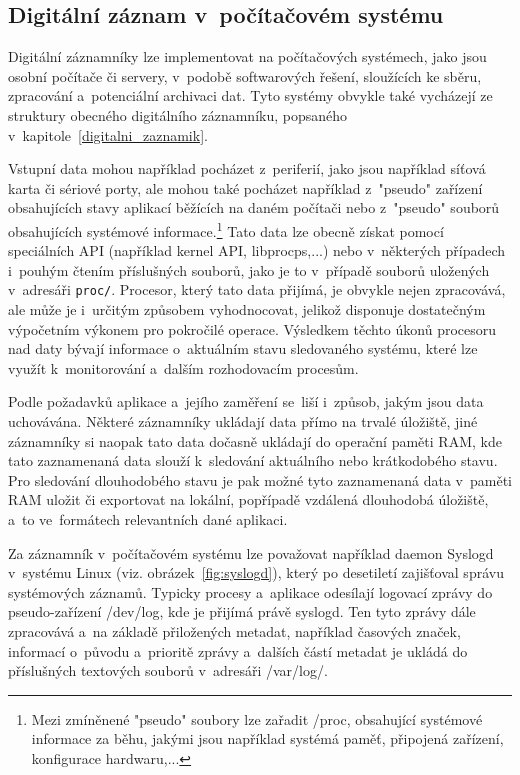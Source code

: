 \newpage

\subsection{Digitální záznam v~počítačovém systému}
Digitální záznamníky lze implementovat na počítačových systémech, jako jsou osobní počítače či servery, v~podobě softwarových řešení, sloužících ke sběru, zpracování a~potenciální archivaci dat. Tyto systémy obvykle také vycházejí ze struktury obecného digitálního záznamníku, popsaného v~kapitole~\ref{digitalni_zaznamik}. 

Vstupní data mohou například pocházet z~periferií, jako jsou například síťová karta či sériové porty, ale mohou také pocházet například z~"pseudo" zařízení obsahujících stavy aplikací běžících na daném počítači nebo z~"pseudo" souborů obsahujících systémové informace.\footnote{Mezi zmíněnené "pseudo" soubory lze zařadit /proc, obsahující systémové informace za běhu, jakými jsou například systémá paměť, připojená zařízení, konfigurace hardwaru,...} Tato data lze obecně získat pomocí speciálních API (například kernel API, libprocps,...) nebo v~některých případech i~pouhým čtením příslušných souborů, jako je to v~případě souborů uložených v~adresáři \texttt{proc/}. Procesor, který tato data přijímá, je obvykle nejen zpracovává, ale může je i~určitým způsobem vyhodnocovat, jelikož disponuje dostatečným výpočetním výkonem pro pokročilé operace. Výsledkem těchto úkonů procesoru nad daty bývají informace o~aktuálním stavu sledovaného systému, které lze využít k~monitorování a~dalším rozhodovacím procesům.~\cite{linux_libprocsp, linux_in_action_log_and_monitoring}

% 
Podle požadavků aplikace a~jejího zaměření se~liší i~způsob, jakým jsou data uchovávána. Některé záznamníky ukládají data přímo na trvalé úložiště, jiné záznamníky si naopak tato data dočasně ukládají do operační paměti RAM, kde tato zaznamenaná data slouží k~sledování aktuálního nebo krátkodobého stavu. Pro sledování dlouhodobého stavu je pak možné tyto zaznamenaná data v~paměti RAM uložit či exportovat na lokální, popřípadě vzdálená dlouhodobá úložiště, a~to ve~formátech relevantních dané aplikaci.~\cite{labview, serial_datalogger_timestamping, linux_in_action_log_and_monitoring}

Za záznamník v~počítačovém systému lze považovat například daemon Syslogd v~systému Linux (viz. obrázek~\ref{fig:syslogd}), který po desetiletí zajišťoval správu systémových záznamů. Typicky procesy a~aplikace odesílají logovací zprávy do pseudo-zařízení /dev/log, kde je přijímá právě syslogd. Ten tyto zprávy dále zpracovává a~na základě přiložených metadat, například časových značek, informací o~původu a~prioritě zprávy a~dalších částí metadat je ukládá do příslušných textových souborů v~adresáři /var/log/.~\cite{linux_in_action_log_and_monitoring}

